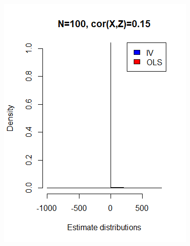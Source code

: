 \documentclass[a4paper,12pt,oneside,English]{article}
\begin{document}
\begin{figure}[p!]
\begin{minipage}[b]{0.5\linewidth}
        \includegraphics[width=\linewidth]{Fig2A.png}
    \end{minipage}
    \begin{minipage}[b]{0.5\linewidth}

\end{minipage}
\end{figure}
\end{document}
